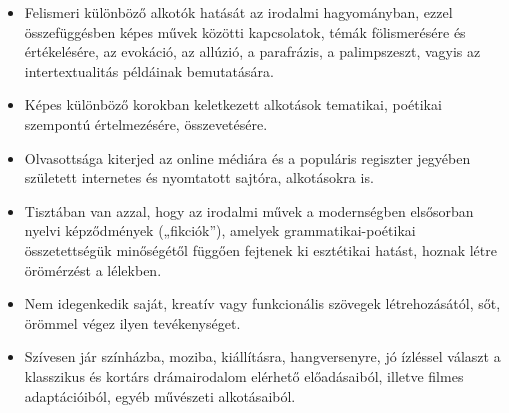 \begin{itemize}
\item Felismeri különböző alkotók hatását az irodalmi hagyományban, ezzel összefüggésben képes művek közötti kapcsolatok, témák fölismerésére és értékelésére, az evokáció, az allúzió, a parafrázis, a palimpszeszt, vagyis az intertextualitás példáinak bemutatására.
\item Képes különböző korokban keletkezett alkotások tematikai, poétikai szempontú értelmezésére, összevetésére.
\item Olvasottsága kiterjed az online médiára és a populáris regiszter jegyében született internetes és nyomtatott sajtóra, alkotásokra is.
\item Tisztában van azzal, hogy az irodalmi művek a modernségben elsősorban nyelvi képződmények („fikciók”), amelyek grammatikai-poétikai összetettségük minőségétől függően fejtenek ki esztétikai hatást, hoznak létre örömérzést a lélekben.
\item Nem idegenkedik saját, kreatív vagy funkcionális szövegek létrehozásától, sőt, örömmel végez ilyen tevékenységet.
\item Szívesen jár színházba, moziba, kiállításra, hangversenyre, jó ízléssel választ a klasszikus és kortárs drámairodalom elérhető előadásaiból, illetve filmes adaptációiból, egyéb művészeti alkotásaiból.
\end{itemize}
